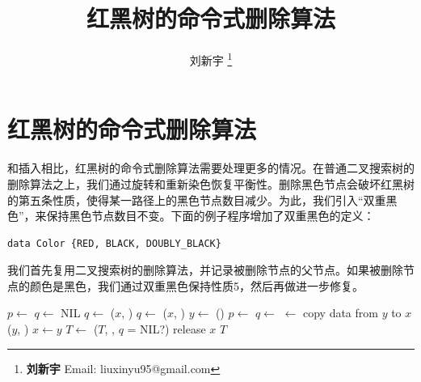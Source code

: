 \documentclass[b5paper]{ctexart}
\begin{document}
\title{红黑树的命令式删除算法}

\author{刘新宇
\thanks{{\bfseries 刘新宇} \newline
  Email: liuxinyu95@gmail.com \newline}
  }

\maketitle
\fi


\ifx\wholebook\relax
\chapter{红黑树的命令式删除算法}
\fi


和插入相比，红黑树的命令式删除算法需要处理更多的情况。在普通二叉搜索树的删除算法之上，我们通过旋转和重新染色恢复平衡性。删除黑色节点会破坏红黑树的第五条性质，使得某一路径上的黑色节点数目减少。为此，我们引入“双重黑色”，来保持黑色节点数目不变。下面的例子程序增加了双重黑色的定义：


\lstset{frame = single}
\begin{lstlisting}[language = Bourbaki]
data Color {RED, BLACK, DOUBLY_BLACK}
\end{lstlisting}

我们首先复用二叉搜索树的删除算法，并记录被删除节点的父节点。如果被删除节点的颜色是黑色，我们通过双重黑色保持性质5，然后再做进一步修复。

\begin{algorithmic}[1]
  \State $p \gets$ 
  \State $q \gets$ NIL
    \State $q \gets$ 
    \State {}($x$, ) 
    \State $q \gets$ 
    \State {}($x$, ) 
  \Else
    \State $y \gets$ ()
    \State $p \gets$ 
    \State $q \gets$ 
    \State {} $\gets$ 
    \State copy data from $y$ to $x$
    \State {}($y$, ) 
    \State $x \gets y$
  \EndIf
    \State $T \gets$ ($T$, , $q$ = NIL?)
  \EndIf
  \State release $x$
  \State \Return $T$
\EndFunction
\end{algorithmic}
\end{document}
